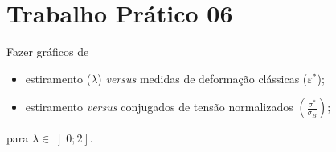 


\section{Trabalho Prático 06}

Fazer gráficos de

\begin{itemize}[
        itemindent=3em
    ]
    \item[a)] estiramento ($\lambda$) \textit{versus} medidas de deformação clássicas
    ($\varepsilon^*$);
    \item[b)] estiramento \textit{versus} conjugados de tensão normalizados
    $\displaystyle\left(\frac{\sigma^*}{\sigma_B}\right)$;
\end{itemize}

para $\lambda \in \left]0; 2\right]$.


